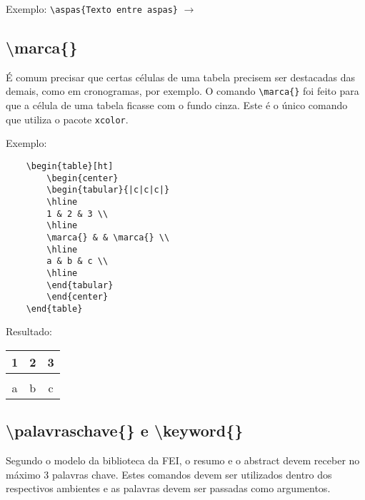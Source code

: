 \documentclass{fei}
\begin{document}
    Exemplo: \verb+\aspas{Texto entre aspas}+ $\to$ 
    
    \subsection{\textbackslash marca\{\}}
    É comum precisar que certas células de uma tabela precisem ser destacadas das demais, como em cronogramas, por exemplo. O comando \verb+\marca{}+ foi feito para que a célula de uma tabela ficasse com o fundo cinza. Este é o único comando que utiliza o pacote \verb+xcolor+.

    Exemplo:
    \begin{verbatim}
    \begin{table}[ht]
        \begin{center}
        \begin{tabular}{|c|c|c|}
        \hline
        1 & 2 & 3 \\
        \hline
        \marca{} & & \marca{} \\
        \hline
        a & b & c \\
        \hline
        \end{tabular}
        \end{center}
    \end{table}
    \end{verbatim}
    Resultado: 
    \begin{table}[ht]
        \begin{center}
        \begin{tabular}{|c|c|c|}
        \hline
        1 & 2 & 3 \\
        \hline
        \marca{} & & \marca{} \\
        \hline
        a & b & c \\
        \hline
        \end{tabular}
        \end{center}
    \end{table}
        
    \subsection{\textbackslash palavraschave\{\} e \textbackslash keyword\{\}}
    Segundo o modelo da biblioteca da FEI, o resumo e o abstract devem receber no máximo 3 palavras chave. Estes comandos devem ser utilizados dentro dos respectivos ambientes e as palavras devem ser passadas como argumentos.
\end{document}
